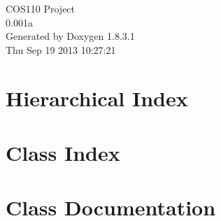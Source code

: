 \documentclass{book}
\begin{document}
\hypersetup{pageanchor=false,citecolor=blue}
\begin{titlepage}
\vspace*{7cm}
\begin{center}
{\Large C\-O\-S110 Project \\[1ex]\large 0.\-001a }\\
\vspace*{1cm}
{\large Generated by Doxygen 1.8.3.1}\\
\vspace*{0.5cm}
{\small Thu Sep 19 2013 10:27:21}\\
\end{center}
\end{titlepage}
\clearemptydoublepage
{}
\tableofcontents
\clearemptydoublepage
{}
\hypersetup{pageanchor=true,citecolor=blue}
\chapter{Hierarchical Index}

\chapter{Class Index}

\chapter{Class Documentation}
























\printindex
\end{document}
